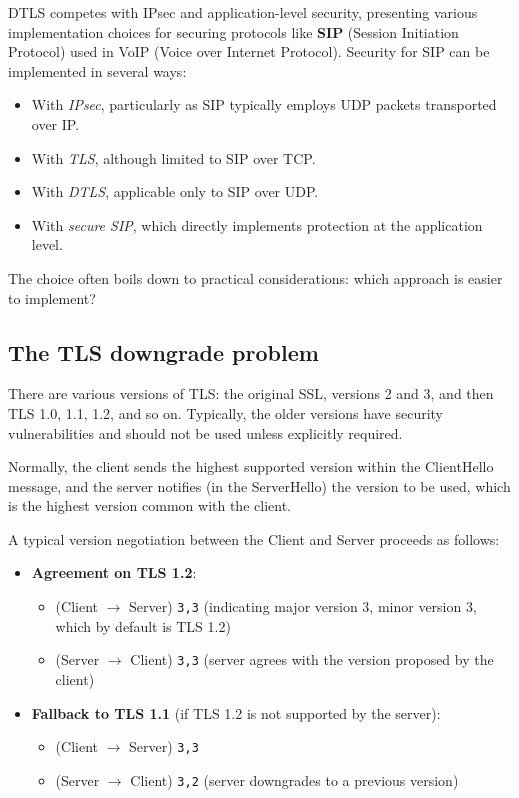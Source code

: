 DTLS competes with IPsec and application-level security, presenting various implementation choices for securing protocols like \textbf{SIP} (Session Initiation Protocol) used in VoIP (Voice over Internet Protocol).
Security for SIP can be implemented in several ways:
\begin{itemize}
	\item With \textit{IPsec}, particularly as SIP typically employs UDP packets transported over IP.
	\item With \textit{TLS}, although limited to SIP over TCP.
	\item With \textit{DTLS}, applicable only to SIP over UDP.
	\item With \textit{secure SIP}, which directly implements protection at the application level.
\end{itemize}

The choice often boils down to practical considerations: which approach is easier to implement?



\subsection{The TLS downgrade problem}

There are various versions of TLS: the original SSL, versions 2 and 3, and then TLS 1.0, 1.1, 1.2, and so on. Typically, the older versions have security vulnerabilities and should not be used unless explicitly required.

Normally, the client sends the highest supported version within the ClientHello message, and the server notifies (in the ServerHello) the version to be used, which is the highest version common with the client.

A typical version negotiation between the Client and Server proceeds as follows:
\begin{itemize}
	\item \textbf{Agreement on TLS 1.2}:
	      \begin{itemize}
		      \item (Client $\rightarrow$ Server) \texttt{3,3} (indicating major version 3, minor version 3, which by default is TLS 1.2)
		      \item (Server $\rightarrow$ Client) \texttt{3,3} (server agrees with the version proposed by the client)
	      \end{itemize}
	\item \textbf{Fallback to TLS 1.1} (if TLS 1.2 is not supported by the server):
	      \begin{itemize}
		      \item (Client $\rightarrow$ Server) \texttt{3,3}
		      \item (Server $\rightarrow$ Client) \texttt{3,2} (server downgrades to a previous version)
	      \end{itemize}
\end{itemize}

